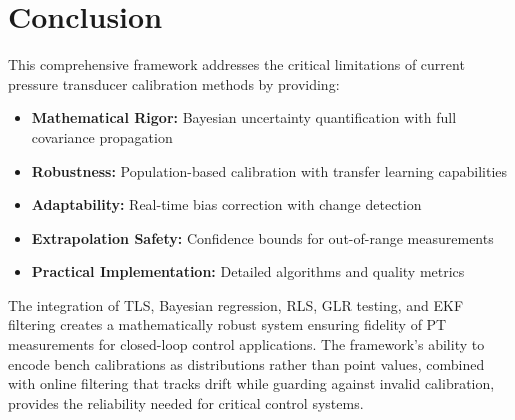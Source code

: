 \documentclass[11pt]{article}
\begin{document}
\section{Conclusion}

This comprehensive framework addresses the critical limitations of current pressure transducer calibration methods by providing:

\begin{itemize}
\item \textbf{Mathematical Rigor:} Bayesian uncertainty quantification with full covariance propagation
\item \textbf{Robustness:} Population-based calibration with transfer learning capabilities
\item \textbf{Adaptability:} Real-time bias correction with change detection
\item \textbf{Extrapolation Safety:} Confidence bounds for out-of-range measurements
\item \textbf{Practical Implementation:} Detailed algorithms and quality metrics
\end{itemize}

The integration of TLS, Bayesian regression, RLS, GLR testing, and EKF filtering creates a mathematically robust system ensuring fidelity of PT measurements for closed-loop control applications. The framework's ability to encode bench calibrations as distributions rather than point values, combined with online filtering that tracks drift while guarding against invalid calibration, provides the reliability needed for critical control systems.
\end{document}
